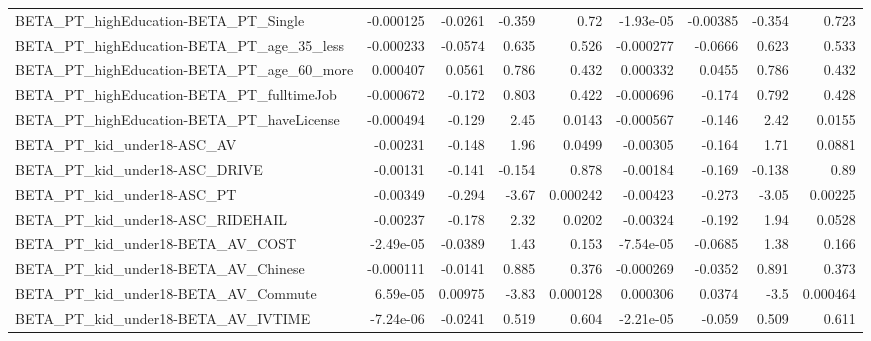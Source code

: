 \begin{tabular}{lrrrrrrrr}
BETA\_PT\_highEducation-BETA\_PT\_Single               &   -0.000125 &      -0.0261 &   -0.359 &     0.72 &  -1.93e-05 &    -0.00385 &       -0.354 &         0.723 \\
BETA\_PT\_highEducation-BETA\_PT\_age\_35\_less          &   -0.000233 &      -0.0574 &    0.635 &    0.526 &  -0.000277 &     -0.0666 &        0.623 &         0.533 \\
BETA\_PT\_highEducation-BETA\_PT\_age\_60\_more          &    0.000407 &       0.0561 &    0.786 &    0.432 &   0.000332 &      0.0455 &        0.786 &         0.432 \\
BETA\_PT\_highEducation-BETA\_PT\_fulltimeJob          &   -0.000672 &       -0.172 &    0.803 &    0.422 &  -0.000696 &      -0.174 &        0.792 &         0.428 \\
BETA\_PT\_highEducation-BETA\_PT\_haveLicense          &   -0.000494 &       -0.129 &     2.45 &   0.0143 &  -0.000567 &      -0.146 &         2.42 &        0.0155 \\
BETA\_PT\_kid\_under18-ASC\_AV                         &    -0.00231 &       -0.148 &     1.96 &   0.0499 &   -0.00305 &      -0.164 &         1.71 &        0.0881 \\
BETA\_PT\_kid\_under18-ASC\_DRIVE                      &    -0.00131 &       -0.141 &   -0.154 &    0.878 &   -0.00184 &      -0.169 &       -0.138 &          0.89 \\
BETA\_PT\_kid\_under18-ASC\_PT                         &    -0.00349 &       -0.294 &    -3.67 & 0.000242 &   -0.00423 &      -0.273 &        -3.05 &       0.00225 \\
BETA\_PT\_kid\_under18-ASC\_RIDEHAIL                   &    -0.00237 &       -0.178 &     2.32 &   0.0202 &   -0.00324 &      -0.192 &         1.94 &        0.0528 \\
BETA\_PT\_kid\_under18-BETA\_AV\_COST                   &   -2.49e-05 &      -0.0389 &     1.43 &    0.153 &  -7.54e-05 &     -0.0685 &         1.38 &         0.166 \\
BETA\_PT\_kid\_under18-BETA\_AV\_Chinese                &   -0.000111 &      -0.0141 &    0.885 &    0.376 &  -0.000269 &     -0.0352 &        0.891 &         0.373 \\
BETA\_PT\_kid\_under18-BETA\_AV\_Commute                &    6.59e-05 &      0.00975 &    -3.83 & 0.000128 &   0.000306 &      0.0374 &         -3.5 &      0.000464 \\
BETA\_PT\_kid\_under18-BETA\_AV\_IVTIME                 &   -7.24e-06 &      -0.0241 &    0.519 &    0.604 &  -2.21e-05 &      -0.059 &        0.509 &         0.611 \\

\end{tabular}
